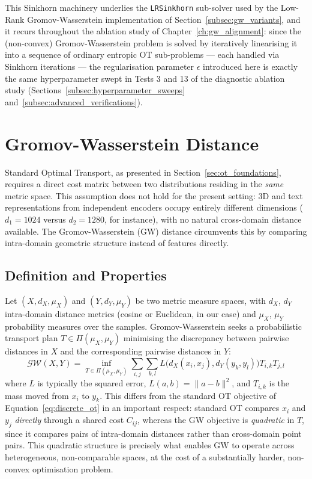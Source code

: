 This Sinkhorn machinery underlies the \texttt{LRSinkhorn} sub-solver used by the Low-Rank Gromov-Wasserstein implementation of Section~\ref{subsec:gw_variants}, and it recurs throughout the ablation study of Chapter~\ref{ch:gw_alignment}: since the (non-convex) Gromov-Wasserstein problem is solved by iteratively linearising it into a sequence of ordinary entropic OT sub-problems --- each handled via Sinkhorn iterations --- the regularisation parameter $\epsilon$ introduced here is exactly the same hyperparameter swept in Tests 3 and 13 of the diagnostic ablation study (Sections~\ref{subsec:hyperparameter_sweeps} and~\ref{subsec:advanced_verifications}).

\section{Gromov-Wasserstein Distance}
\label{sec:gw_distance}

Standard Optimal Transport, as presented in Section~\ref{sec:ot_foundations}, requires a direct cost matrix between two distributions residing in the \emph{same} metric space. This assumption does not hold for the present setting: 3D and text representations from independent encoders occupy entirely different dimensions ($d_1 = 1024$ versus $d_2 = 1280$, for instance), with no natural cross-domain distance available. The Gromov-Wasserstein (GW) distance circumvents this by comparing intra-domain geometric structure instead of features directly.

\subsection{Definition and Properties}
\label{subsec:gw_definition}

Let $(X, d_X, \mu_X)$ and $(Y, d_Y, \mu_Y)$ be two metric measure spaces, with $d_X$, $d_Y$ intra-domain distance metrics (cosine or Euclidean, in our case) and $\mu_X$, $\mu_Y$ probability measures over the samples. Gromov-Wasserstein seeks a probabilistic transport plan $T \in \Pi(\mu_X, \mu_Y)$ minimising the discrepancy between pairwise distances in $X$ and the corresponding pairwise distances in $Y$:
\begin{equation}
    \mathcal{GW}(X, Y) = \inf_{T \in \Pi(\mu_X, \mu_Y)} \sum_{i,j} \sum_{k,l} L\Big( d_X(x_i, x_j), d_Y(y_k, y_l) \Big) T_{i,k} T_{j,l}
\end{equation}
where $L$ is typically the squared error, $L(a,b) = \|a - b\|^2$, and $T_{i,k}$ is the mass moved from $x_i$ to $y_k$. This differs from the standard OT objective of Equation~\ref{eq:discrete_ot} in an important respect: standard OT compares $x_i$ and $y_j$ \emph{directly} through a shared cost $C_{ij}$, whereas the GW objective is \emph{quadratic} in $T$, since it compares pairs of intra-domain distances rather than cross-domain point pairs. This quadratic structure is precisely what enables GW to operate across heterogeneous, non-comparable spaces, at the cost of a substantially harder, non-convex optimisation problem.

